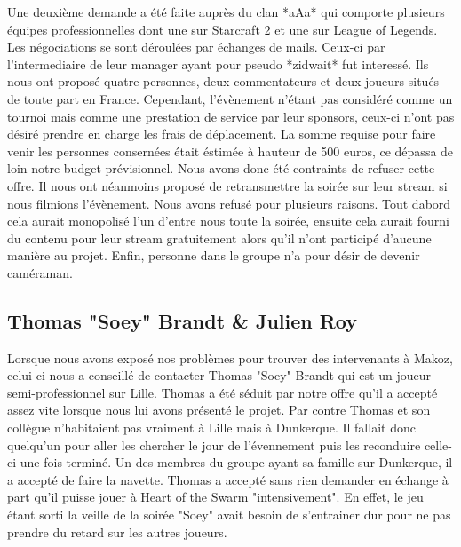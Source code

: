 Une deuxième demande a été faite auprès du clan *aAa* qui comporte
plusieurs équipes professionnelles dont une sur Starcraft 2 et une sur
League of Legends. Les négociations se sont déroulées par échanges de mails. 
Ceux-ci par l'intermediaire de leur manager ayant pour
pseudo *zidwait* fut interessé. Ils nous ont proposé quatre personnes,
deux commentateurs et deux joueurs situés de toute part en France.
Cependant, l'évènement n'étant pas considéré comme un tournoi mais comme
une prestation de service par leur sponsors, ceux-ci n'ont pas désiré
prendre en charge les frais de déplacement. La somme requise pour faire
venir les personnes consernées était éstimée à hauteur de 500 euros, ce
dépassa de loin notre budget prévisionnel. Nous avons donc été
contraints de refuser cette offre. Il nous ont néanmoins proposé de
retransmettre la soirée sur leur stream si nous filmions l'évènement.
Nous avons refusé pour plusieurs raisons. Tout dabord cela aurait
monopolisé l'un d'entre nous toute la soirée, ensuite cela aurait fourni
du contenu pour leur stream gratuitement alors qu'il n'ont participé
d'aucune manière au projet. Enfin, personne dans le groupe n'a pour
désir de devenir caméraman.

\subsection{Thomas "Soey" Brandt \& Julien Roy}%
\label{sub:tthomas_soey_brandt_&_julien_roy}

Lorsque nous avons exposé nos problèmes pour trouver des intervenants à
Makoz, celui-ci nous a conseillé de contacter Thomas "Soey" Brandt qui
est un joueur semi-professionnel sur Lille. Thomas a été séduit par
notre offre qu'il a accepté assez vite lorsque nous lui avons présenté
le projet. Par contre Thomas et son collègue n'habitaient pas vraiment à
Lille mais à Dunkerque. Il fallait donc quelqu'un pour aller les
chercher le jour de l'évennement puis les reconduire celle-ci une fois
terminé. Un des membres du groupe ayant sa famille sur Dunkerque, il a
accepté de faire la navette. Thomas a accepté sans rien demander en
échange à part qu'il puisse jouer à Heart of the Swarm "intensivement".
En effet, le jeu étant sorti la veille de la soirée "Soey" avait besoin
de s'entrainer dur pour ne pas prendre du retard sur les autres joueurs.


